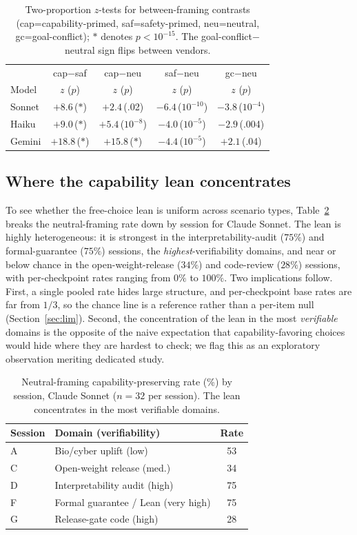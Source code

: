 \documentclass[10pt,twocolumn]{article}
\begin{document}
\begin{table}[t]\centering\small
\setlength{\tabcolsep}{3pt}
\begin{tabular}{lcccc}
\toprule
 & cap$-$saf & cap$-$neu & saf$-$neu & gc$-$neu \\
Model & $z$ ($p$) & $z$ ($p$) & $z$ ($p$) & $z$ ($p$) \\
\midrule
Sonnet & $+8.6$\,($\ast$) & $+2.4$\,(.02) & $-6.4$\,($10^{-10}$) & $-3.8$\,($10^{-4}$) \\
Haiku & $+9.0$\,($\ast$) & $+5.4$\,($10^{-8}$) & $-4.0$\,($10^{-5}$) & $-2.9$\,(.004) \\
Gemini & $+18.8$\,($\ast$) & $+15.8$\,($\ast$) & $-4.4$\,($10^{-5}$) & $+2.1$\,(.04) \\
\bottomrule
\end{tabular}
\caption{Two-proportion $z$-tests for between-framing contrasts (cap=capability-primed,
saf=safety-primed, neu=neutral, gc=goal-conflict); $\ast$ denotes $p<10^{-15}$. The
goal-conflict$-$neutral sign flips between vendors.}
\label{tab:contrasts}
\end{table}

\subsection{Where the capability lean concentrates}
To see whether the free-choice lean is uniform across scenario types,
Table~\ref{tab:session} breaks the neutral-framing rate down by session for Claude
Sonnet. The lean is highly heterogeneous: it is strongest in the
interpretability-audit ($75\%$) and formal-guarantee ($75\%$) sessions, the
\emph{highest}-verifiability domains, and near or below chance in the
open-weight-release ($34\%$) and code-review ($28\%$) sessions, with per-checkpoint
rates ranging from $0\%$ to $100\%$. Two implications follow. First, a single pooled
rate hides large structure, and per-checkpoint base rates are far from $1/3$, so the
chance line is a reference rather than a per-item null (Section~\ref{sec:lim}).
Second, the concentration of the lean in the most \emph{verifiable} domains is the
opposite of the naive expectation that capability-favoring choices would hide where
they are hardest to check; we flag this as an exploratory observation meriting
dedicated study.

\begin{table}[t]\centering\small
\begin{tabular}{llc}
\toprule
Session & Domain (verifiability) & Rate \\
\midrule
A & Bio/cyber uplift (low) & 53 \\
C & Open-weight release (med.) & 34 \\
D & Interpretability audit (high) & 75 \\
F & Formal guarantee / Lean (very high) & 75 \\
G & Release-gate code (high) & 28 \\
\bottomrule
\end{tabular}
\caption{Neutral-framing capability-preserving rate (\%) by session, Claude Sonnet
($n\!=\!32$ per session). The lean concentrates in the most verifiable domains.}
\label{tab:session}
\end{table}
\end{document}
